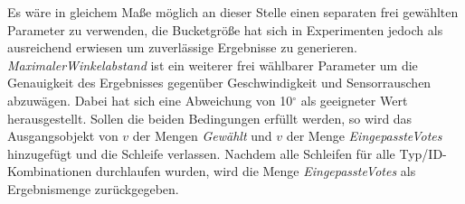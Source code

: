 Es wäre in gleichem Maße möglich an dieser Stelle einen separaten frei gewählten Parameter zu verwenden, die Bucketgröße hat sich in Experimenten jedoch als ausreichend erwiesen um zuverlässige Ergebnisse zu generieren.
\textit{MaximalerWinkelabstand} ist ein weiterer frei wählbarer Parameter um die Genauigkeit des Ergebnisses gegenüber Geschwindigkeit und Sensorrauschen abzuwägen.
Dabei hat sich eine Abweichung von 10$^\circ$ als geeigneter Wert herausgestellt.
Sollen die beiden Bedingungen erfüllt werden, so wird das Ausgangsobjekt von $v$ der Mengen \textit{Gewählt} und $v$ der Menge \textit{EingepassteVotes} hinzugefügt und die Schleife verlassen.
Nachdem alle Schleifen für alle Typ/ID-Kombinationen durchlaufen wurden, wird die Menge \textit{EingepassteVotes} als Ergebnismenge zurückgegeben.
